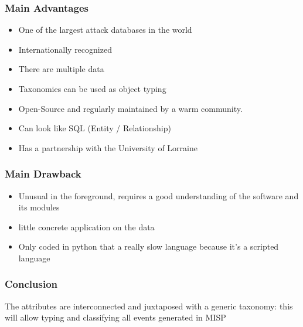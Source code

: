 \documentclass[12pt]{report}
\begin{document}
\subsubsection*{Main Advantages}
\setlength{\parskip}{0.0pt}
\begin{itemize}
	\item One of the largest attack databases in the world

	\item Internationally recognized

	\item There are multiple data

	\item Taxonomies can be used as object typing

	\item Open-Source and regularly maintained by a warm community.\par

	\item Can look like SQL (Entity / Relationship)\par

	\item Has a partnership with the University of Lorraine\par
\setlength{\parskip}{8.04pt}

\end{itemize}\subsubsection*{Main Drawback }

\begin{itemize}
	\item Unusual in the foreground, requires a good understanding of the software and its modules\par
	\item little concrete application on the data\par
	\item Only coded in python that a really slow language because it’s a scripted language
\end{itemize}\par

\subsubsection*{Conclusion }
	\item The attributes are interconnected and juxtaposed with a generic taxonomy: this will allow typing and classifying all events generated in MISP\par
\end{document}
